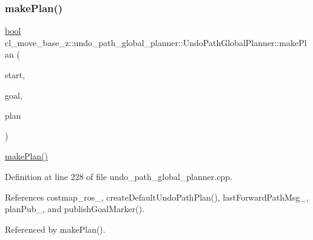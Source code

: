 \subsubsection{\texorpdfstring{make\+Plan()}{makePlan()}\hspace{0.1cm}{\footnotesize\ttfamily [1/2]}}
{\footnotesize\ttfamily \hyperlink{classbool}{bool} cl\+\_\+move\+\_\+base\+\_\+z\+::undo\+\_\+path\+\_\+global\+\_\+planner\+::\+Undo\+Path\+Global\+Planner\+::make\+Plan (\begin{DoxyParamCaption}\item[{const geometry\+\_\+msgs\+::\+Pose\+Stamped \&}]{start,  }\item[{const geometry\+\_\+msgs\+::\+Pose\+Stamped \&}]{goal,  }\item[{std\+::vector$<$ geometry\+\_\+msgs\+::\+Pose\+Stamped $>$ \&}]{plan }\end{DoxyParamCaption})}

\hyperlink{classcl__move__base__z_1_1undo__path__global__planner_1_1UndoPathGlobalPlanner_a46034d27c0811abae440009457a7f8b0}{make\+Plan()} 

Definition at line 228 of file undo\+\_\+path\+\_\+global\+\_\+planner.\+cpp.



References costmap\+\_\+ros\+\_\+, create\+Default\+Undo\+Path\+Plan(), last\+Forward\+Path\+Msg\+\_\+, plan\+Pub\+\_\+, and publish\+Goal\+Marker().



Referenced by make\+Plan().



